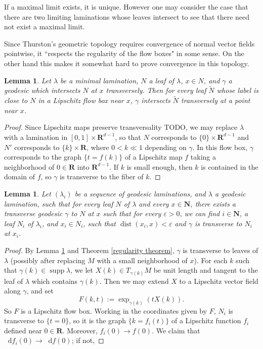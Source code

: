 \documentclass[reqno,10pt]{amsart}
\newcommand{\NN}{\mathbf{N}}
\newcommand{\RR}{\mathbf{R}}
\newcommand*\dif{\mathop{}\!\mathrm{d}}
\DeclareMathOperator{\dist}{dist}
\DeclareMathOperator{\supp}{supp}
\newtheorem{lemma}[theorem]{Lemma}
\theoremstyle{definition}
\numberwithin{equation}{section}
\begin{document}
If a maximal limit exists, it is unique.
However one may consider the case that there are two limiting laminations whose leaves intersect to see that there need not exist a maximal limit.

Since Thurston's geometric topology requires convergence of normal vector fields pointwise, it ``respects the regularity of the flow boxes" in some sense.
On the other hand this makes it somewhat hard to prove convergence in this topology.

\begin{lemma}\label{transverse at one implies transverse at all}
Let $\lambda$ be a minimal lamination, $N$ a leaf of $\lambda$, $x \in N$, and $\gamma$ a geodesic which intersects $N$ at $x$ transversely.
Then for every leaf $\tilde N$ whose label is close to $N$ in a Lipschitz flow box near $x$, $\gamma$ intersects $\tilde N$ transversely at a point near $x$.
\end{lemma}
\begin{proof}
Since Lipschitz maps preserve transversality TODO, we may replace $\lambda$ with a lamination in $[0, 1] \times \RR^{d - 1}$, so that $N$ corresponds to $\{0\} \times \RR^{d - 1}$ and $N'$ corresponds to $\{k\} \times \RR$, where $0 < k \ll 1$ depending on $\gamma$.
In this flow box, $\gamma$ corresponds to the graph $\{t = f(k)\}$ of a Lipschitz map $f$ taking a neighborhood of $0 \in \RR$ into $\RR^{d - 1}$.
If $k$ is small enough, then $k$ is contained in the domain of $f$, so $\gamma$ is transverse to the fiber of $k$.
\end{proof}

\begin{lemma}
Let $(\lambda_i)$ be a sequence of geodesic laminations, and $\lambda$ a geodesic lamination, such that for every leaf $N$ of $\lambda$ and every $x \in \NN$, there exists a transverse geodesic $\gamma$ to $N$ at $x$ such that for every $\varepsilon > 0$, we can find $i \in \NN$, a leaf $N_i$ of $\lambda_i$, and $x_i \in N_i$, such that $\dist(x_i, x) < \varepsilon$ and $\gamma$ is transverse to $N_i$ at $x_i$.
\end{lemma}
\begin{proof}
By Lemma \ref{transverse at one implies transverse at all} and Theorem \ref{regularity theorem}, $\gamma$ is transverse to leaves of $\lambda$ (possibly after replacing $M$ with a small neighborhood of $x$).
For each $k$ such that $\gamma(k) \in \supp \lambda$, we let $X(k) \in T_{\gamma(k)} M$ be unit length and tangent to the leaf of $\lambda$ which contains $\gamma(k)$.
Then we may extend $X$ to a Lipschitz vector field along $\gamma$, and set
$$F(k, t) := \exp_{\gamma(k)}(tX(k)).$$
So $F$ is a Lipschitz flow box.
Working in the coordinates given by $F$, $N_i$ is transverse to $\{t = 0\}$, so it is the graph $\{k = f_i(t)\}$ of a Lipschitz function $f_i$ defined near $0 \in \RR$.
Moreover, $f_i(0) \to f(0)$.
We claim that $\dif f_i(0) \to \dif f(0)$; if not,
\end{proof}
\end{document}
